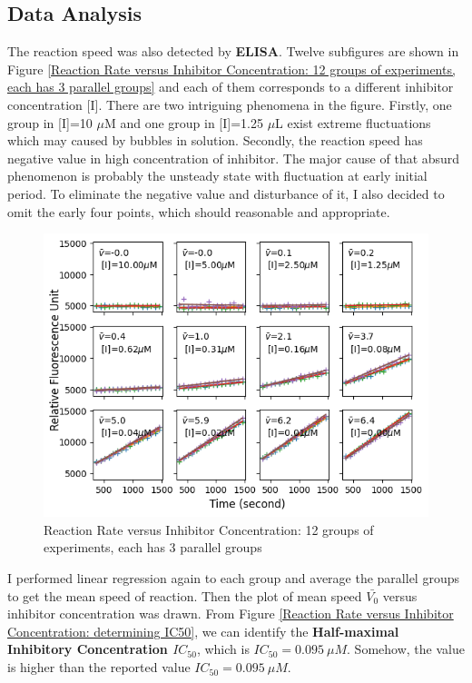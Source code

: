 \documentclass{report}
\begin{document}
\subsection{Data Analysis}
The reaction speed was also detected by \textbf{ELISA}.
Twelve subfigures are shown in Figure \ref{Reaction Rate versus Inhibitor Concentration: 12 groups of experiments, each has 3 parallel groups} and each of them corresponds to a different inhibitor concentration [I].
There are two intriguing phenomena in the figure.
Firstly, one group in [I]=10 $\mu$M and one group in [I]=1.25 $\mu$L exist extreme fluctuations which may caused by bubbles in solution.
Secondly, the reaction speed has negative value in high concentration of inhibitor.
The major cause of that absurd phenomenon is probably the unsteady state with fluctuation at early initial period.
To eliminate the negative value and disturbance of it, I also decided to omit the early four points, which should reasonable and appropriate.


\begin{figure}
    \centering
    \includegraphics[width=1\linewidth]{../Figures/inhibitor1.png}
    \caption{Reaction Rate versus Inhibitor Concentration: 12 groups of experiments, each has 3
    parallel groups}
    \label{Reaction Rate versus Inhibitor Concentration: 12 groups of experiments, each has 3
    parallel groups}
\end{figure}

I performed linear regression again to each group and average the parallel groups to get the mean speed of reaction.
Then the plot of mean speed $\bar{V_0}$ versus inhibitor concentration was drawn.
From Figure \ref{Reaction Rate versus Inhibitor Concentration: determining IC50}, we can identify the \textbf{Half-maximal Inhibitory Concentration $IC_{50}$}, which is $IC_{50}=0.095\ \mu M$.
Somehow, the value is higher than the reported value $IC_{50}=0.095\ \mu M$.
\end{document}
